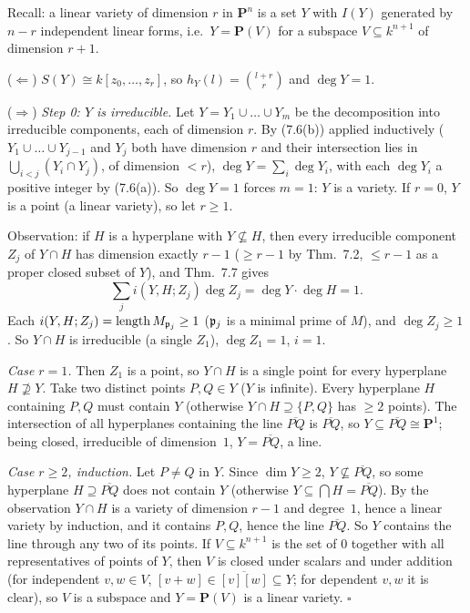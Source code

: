 \documentclass[11pt]{article}
\begin{document}
\pf
Recall: a linear variety of dimension $r$ in $\mathbf P^n$ is a set $Y$ with $I(Y)$ generated by $n-r$ independent linear forms, i.e.\ $Y=\mathbf P(V)$ for a subspace $V\subseteq k^{n+1}$ of dimension $r+1$.

($\Leftarrow$) $S(Y)\cong k[z_0,\dots,z_r]$, so $h_Y(l)=\binom{l+r}{r}$ and $\deg Y=1$.

($\Rightarrow$) \emph{Step 0: $Y$ is irreducible.} Let $Y=Y_1\cup\dots\cup Y_m$ be the decomposition into irreducible components, each of dimension $r$. By (7.6(b)) applied inductively ($Y_1\cup\dots\cup Y_{j-1}$ and $Y_j$ both have dimension $r$ and their intersection lies in $\bigcup_{i<j}(Y_i\cap Y_j)$, of dimension $<r$), $\deg Y=\sum_i\deg Y_i$, with each $\deg Y_i$ a positive integer by (7.6(a)). So $\deg Y=1$ forces $m=1$: $Y$ is a variety. If $r=0$, $Y$ is a point (a linear variety), so let $r\ge1$.

Observation: if $H$ is a hyperplane with $Y\not\subseteq H$, then every irreducible component $Z_j$ of $Y\cap H$ has dimension exactly $r-1$ ($\ge r-1$ by Thm.~7.2, $\le r-1$ as a proper closed subset of $Y$), and Thm.~7.7 gives
\[
\sum_ji(Y,H;Z_j)\deg Z_j=\deg Y\cdot\deg H=1.
\]
Each $i(Y,H;Z_j)=\operatorname{length}M_{\mathfrak p_j}\ge1$ ($\mathfrak p_j$ is a minimal prime of $M$), and $\deg Z_j\ge1$. So $Y\cap H$ is irreducible (a single $Z_1$), $\deg Z_1=1$, $i=1$.

\emph{Case $r=1$.} Then $Z_1$ is a point, so $Y\cap H$ is a single point for every hyperplane $H\not\supseteq Y$. Take two distinct points $P,Q\in Y$ ($Y$ is infinite). Every hyperplane $H$ containing $P,Q$ must contain $Y$ (otherwise $Y\cap H\supseteq\{P,Q\}$ has $\ge2$ points). The intersection of all hyperplanes containing the line $\overline{PQ}$ is $\overline{PQ}$, so $Y\subseteq\overline{PQ}\cong\mathbf P^1$; being closed, irreducible of dimension~$1$, $Y=\overline{PQ}$, a line.

\emph{Case $r\ge2$, induction.} Let $P\ne Q$ in $Y$. Since $\dim Y\ge2$, $Y\not\subseteq\overline{PQ}$, so some hyperplane $H\supseteq\overline{PQ}$ does not contain $Y$ (otherwise $Y\subseteq\bigcap H=\overline{PQ}$). By the observation $Y\cap H$ is a variety of dimension $r-1$ and degree~$1$, hence a linear variety by induction, and it contains $P,Q$, hence the line $\overline{PQ}$. So $Y$ contains the line through any two of its points. If $V\subseteq k^{n+1}$ is the set of $0$ together with all representatives of points of $Y$, then $V$ is closed under scalars and under addition (for independent $v,w\in V$, $[v+w]\in\overline{[v][w]}\subseteq Y$; for dependent $v,w$ it is clear), so $V$ is a subspace and $Y=\mathbf P(V)$ is a linear variety. \hfill$\square$
\end{document}
